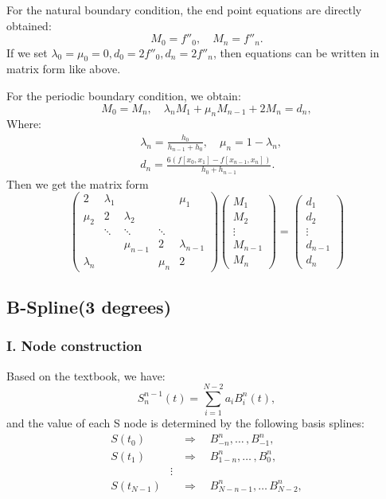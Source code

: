 \documentclass[a4paper]{article}
\begin{document}
For the natural boundary condition, the end point equations are directly obtained:
\[
M_0 = f''_0, \quad M_n = f''_n. 
\]
If we set \( \lambda_0 = \mu_0 = 0, d_0 = 2f''_0, d_n = 2f''_n \), then equations can be written in matrix form like above.

For the periodic boundary condition, we obtain:
\[
M_0 = M_n, \quad \lambda_n M_1 + \mu_n M_{n-1} + 2 M_n = d_n, 
\]
Where:
\begin{align*}
    &\lambda_n = \frac{h_0}{h_{n-1} + h_0}, \quad \mu_n = 1 - \lambda_n,\\
    &d_n = \frac{6( f[x_0, x_1] - f[x_{n-1}, x_n] )}{h_0 + h_{n-1}} .
\end{align*}
Then we get the matrix form
\[
\begin{pmatrix}
    2&\lambda_1& & & \mu_1 \\
    \mu_2&2&\lambda_2 \\
     &\ddots&\ddots&\ddots\\
      & & \mu_{n-1}&2&\lambda_{n-1}\\
     \lambda_n & & & \mu_n&2
\end{pmatrix}
\begin{pmatrix}
    M_1\\
    M_2\\
    \vdots\\
    M_{n-1}\\
    M_n
\end{pmatrix}
=
\begin{pmatrix}
    d_1\\
    d_2\\
    \vdots\\
    d_{n-1}\\
    d_n
\end{pmatrix}
\]

\subsection*{B-Spline(3 degrees)}
\subsubsection*{I. Node construction}

Based on the textbook, we have:
\[
S_n^{n-1}(t)=\sum^{N-2}_{i=1}a_iB_i^n(t),
\]
and the value of each S node is determined by the following basis splines:
\begin{align*}
    S(t_0)&\quad\Rightarrow\quad B^n_{-n},\ldots\, ,B_{-1}^n,\\
    S(t_1)&\quad\Rightarrow\quad B^n_{1-n},\ldots\, ,B_{0}^n,\\
    &\vdots\\
    S(t_{N-1})&\quad\Rightarrow\quad B^n_{N-n-1},\ldots\, B_{N-2}^n,\\
\end{align*}
\end{document}
